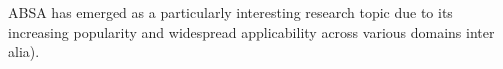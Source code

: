 \documentclass[11pt]{article}
\begin{document}












ABSA has emerged as a particularly interesting research topic due to its increasing popularity and widespread applicability across various domains \citealp{rink-etal-2024-aspect,Namee2022,10099815,arianto-budi-2020-aspect,Chu2022,10151883} inter alia).

\end{document}
